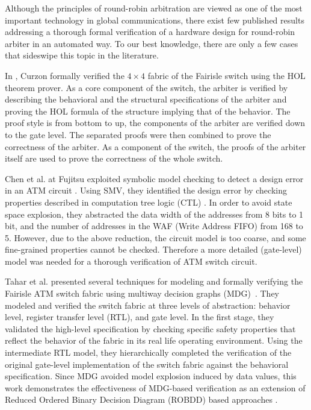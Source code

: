 \documentclass[final]{IEEEtran}
\begin{document}
Although the principles of round-robin arbitration are viewed as one of
the most important technology in global communications, there exist
few published results addressing a thorough formal verification of
a hardware design for round-robin arbiter in an automated way. To
our best knowledge, there are only a few cases that sideswipe this
topic in the literature.

In \cite{Paul94, PaulTech94}, Curzon formally verified the $4 \times 4$
fabric of the Fairisle switch using the HOL theorem prover. As
a core component of the switch, the arbiter is verified by
describing the behavioral and the structural specifications of the
arbiter and proving the HOL formula of the structure implying that
of the behavior. The proof style is from bottom to up, the
components of the arbiter are verified down to the gate level.
The separated proofs were then combined to prove the
correctness of the arbiter. As a component of the switch, the proofs
of the arbiter itself are used to prove the correctness of the whole
switch.

Chen et al. at Fujitsu exploited symbolic
model checking to detect a design error in an ATM circuit
\cite{ChenYF94}. Using SMV, they identified the design error by
checking properties described in computation tree logic (CTL)
\cite{Clarke:1986:AVF:5397.5399}. In order to avoid state space
explosion, they abstracted the data width of the addresses from 8
bits to 1 bit, and the number of addresses in the WAF (Write Address
FIFO) from 168 to 5. However, due to the above reduction, the
circuit model is too coarse, and some fine-grained properties cannot
be checked. Therefore a more detailed (gate-level) model was needed
for a thorough verification of ATM switch circuit.

Tahar et al. presented several techniques for modeling and formally
verifying  the Fairisle  ATM switch fabric using multiway decision
graphs (MDG)~\cite{DBLP:journals/tcad/TaharSCZLM99}.  They modeled
and verified the switch fabric at three levels of abstraction:
behavior level, register transfer level (RTL), and gate level. In
the first stage, they validated the high-level specification by
checking specific safety properties that reflect the behavior of the
fabric in its real life operating environment. Using the
intermediate RTL model, they hierarchically completed the
verification of the original gate-level implementation of the switch
fabric against the behavioral specification. Since MDG avoided model
explosion induced by data values, this work demonstrates the
effectiveness of MDG-based verification as an extension of Reduced
Ordered Binary Decision Diagram (ROBDD) based approaches
\cite{Bryant:1986:GAB:6432.6433}.
\end{document}
